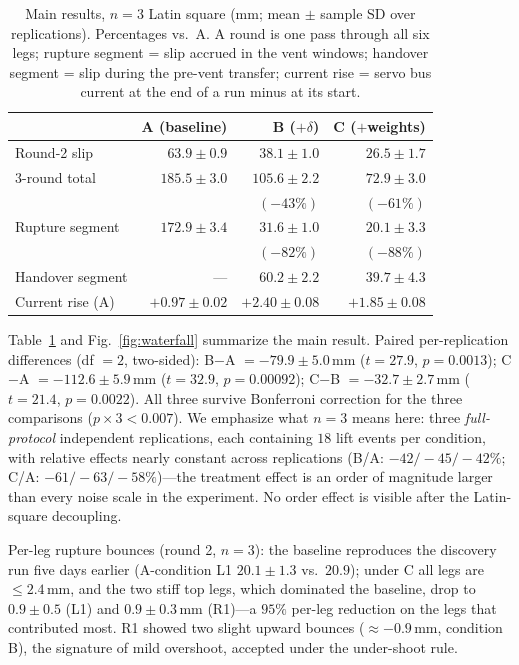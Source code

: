 \documentclass[journal]{IEEEtran}
\begin{document}
\begin{table}[t]
\caption{Main results, $n{=}3$ Latin square (mm; mean $\pm$ sample SD
over replications). Percentages vs.\ A. A round is one pass through all
six legs; rupture segment = slip accrued in the vent windows; handover
segment = slip during the pre-vent transfer; current rise = servo bus
current at the end of a run minus at its start.}
\label{tab:main}
\centering
\footnotesize
\setlength{\tabcolsep}{3.5pt}
\begin{tabular}{@{}lrrr@{}}
\toprule
 & A (baseline) & B ($+\delta$) & C ($+$weights) \\
\midrule
Round-2 slip & $63.9\pm0.9$ & $38.1\pm1.0$ & $26.5\pm1.7$ \\
3-round total & $185.5\pm3.0$ & $105.6\pm2.2$ & $72.9\pm3.0$ \\
 & & $(-43\%)$ & $(-61\%)$ \\
Rupture segment & $172.9\pm3.4$ & $31.6\pm1.0$ & $20.1\pm3.3$ \\
 & & $(-82\%)$ & $(-88\%)$ \\
Handover segment & --- & $60.2\pm2.2$ & $39.7\pm4.3$ \\
Current rise (A) & $+0.97\pm0.02$ & $+2.40\pm0.08$ & $+1.85\pm0.08$ \\
\bottomrule
\end{tabular}
\end{table}

Table~\ref{tab:main} and Fig.~\ref{fig:waterfall} summarize the main
result.
Paired per-replication
differences (df $=2$, two-sided): B$-$A $=-79.9\pm5.0$\,mm
($t=27.9$, $p=0.0013$); C$-$A $=-112.6\pm5.9$\,mm ($t=32.9$,
$p=0.00092$); C$-$B $=-32.7\pm2.7$\,mm ($t=21.4$, $p=0.0022$). All
three survive Bonferroni correction for the three comparisons
($p\times3 < 0.007$). We emphasize what $n{=}3$ means here: three
\emph{full-protocol} independent replications, each containing
$18$ lift events per condition, with relative effects nearly constant
across replications (B/A: $-42/-45/-42\%$; C/A: $-61/-63/-58\%$)---the
treatment effect is an order of magnitude larger than every noise scale
in the experiment. No order effect is visible after the Latin-square
decoupling.

Per-leg rupture bounces (round 2, $n{=}3$): the baseline reproduces the
discovery run five days earlier (A-condition L1 $20.1\pm1.3$ vs.\
$20.9$); under C all legs are ${\le}2.4$\,mm, and the two stiff top
legs, which dominated the baseline, drop to $0.9\pm0.5$ (L1) and
$0.9\pm0.3$\,mm (R1)---a $95\%$ per-leg reduction on the legs that
contributed most. R1 showed two slight upward bounces
(${\approx}-0.9$\,mm, condition B), the signature of mild overshoot,
accepted under the under-shoot rule.
\end{document}

